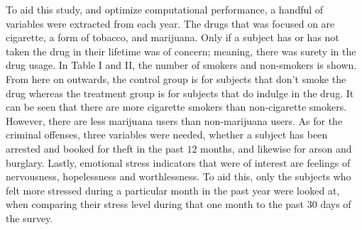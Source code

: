 \documentclass[a4paper, 10pt, conference]{ieeeconf}      %
\begin{document}
To aid this study, and optimize computational performance, a handful of variables were extracted from each year. The drugs that was focused on are cigarette, a form of tobacco, and marijuana. Only if a subject has or has not taken the drug in their lifetime was of concern; meaning, there was surety in the drug usage. In Table I and II, the number of smokers and non-smokers is shown.  From here on outwards, the control group is for subjects that don't smoke the drug whereas the treatment group is for subjects that do indulge in the drug. It can be seen that there are more cigarette smokers than non-cigarette smokers. However, there are less marijuana users than non-marijuana users. As for the criminal offenses, three variables were needed, whether a subject has been arrested and booked for theft in the past $12$ months, and likewise for arson and burglary. Lastly, emotional stress indicators that were of interest are feelings of nervousness, hopelessness and worthlessness. To aid this, only the subjects who felt more stressed during a particular month in the past year were looked at, when comparing their stress level during that one month to the past 30 days of the survey. 
\end{document}
